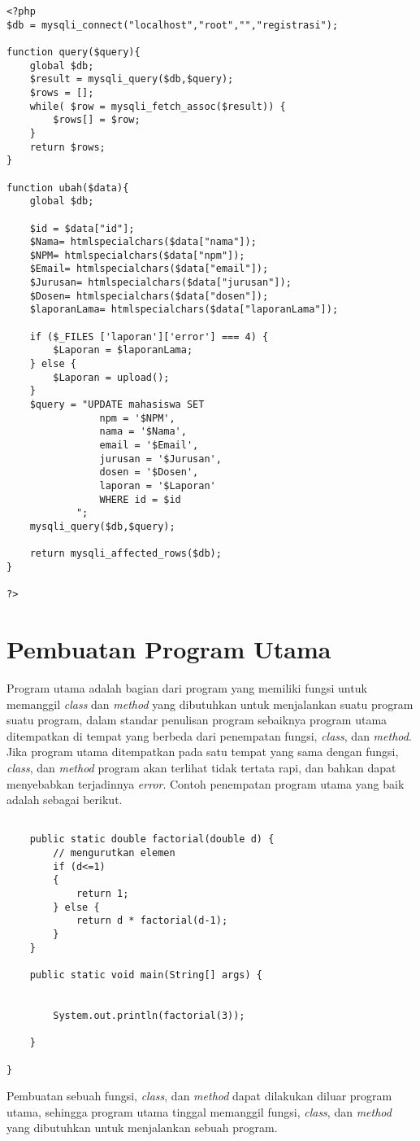 \begin{verbatim}
<?php 
$db = mysqli_connect("localhost","root","","registrasi");

function query($query){
	global $db;
	$result = mysqli_query($db,$query);
	$rows = [];
	while( $row = mysqli_fetch_assoc($result)) {
		$rows[] = $row; 
	}
	return $rows;
}

function ubah($data){
	global $db;

	$id = $data["id"];
	$Nama= htmlspecialchars($data["nama"]);
	$NPM= htmlspecialchars($data["npm"]);
	$Email= htmlspecialchars($data["email"]);
	$Jurusan= htmlspecialchars($data["jurusan"]); 
	$Dosen= htmlspecialchars($data["dosen"]);
	$laporanLama= htmlspecialchars($data["laporanLama"]);

	if ($_FILES ['laporan']['error'] === 4) {
		$Laporan = $laporanLama;
	} else {
		$Laporan = upload();
	}
	$query = "UPDATE mahasiswa SET 
				npm = '$NPM',
				nama = '$Nama',
				email = '$Email',
				jurusan = '$Jurusan',
				dosen = '$Dosen',
				laporan = '$Laporan' 
				WHERE id = $id
			";
	mysqli_query($db,$query);

	return mysqli_affected_rows($db);
}

?>
\end{verbatim}

\section{Pembuatan Program Utama}
\par 
Program utama adalah bagian dari program yang memiliki fungsi untuk memanggil \textit{class} dan \textit{method} yang dibutuhkan untuk menjalankan suatu program suatu program, dalam standar penulisan program sebaiknya program utama ditempatkan di tempat yang berbeda dari penempatan  fungsi, \textit{class}, dan \textit{method}. Jika program utama ditempatkan pada satu tempat yang sama dengan fungsi, \textit{class}, dan \textit{method} program akan terlihat tidak tertata rapi, dan bahkan dapat menyebabkan terjadinnya \textit{error}. Contoh penempatan program utama yang baik adalah sebagai berikut.

\begin{verbatim}
	
	public static double factorial(double d) {
		// mengurutkan elemen
		if (d<=1)
		{
			return 1;
		} else {
			return d * factorial(d-1);
		}
	}

	public static void main(String[] args) {
	
		
		System.out.println(factorial(3));
		
	}

}
\end{verbatim}
\par 
Pembuatan sebuah fungsi, \textit{class}, dan \textit{method} dapat dilakukan diluar program utama, sehingga program utama tinggal memanggil fungsi, \textit{class}, dan \textit{method} yang dibutuhkan untuk menjalankan sebuah program.



